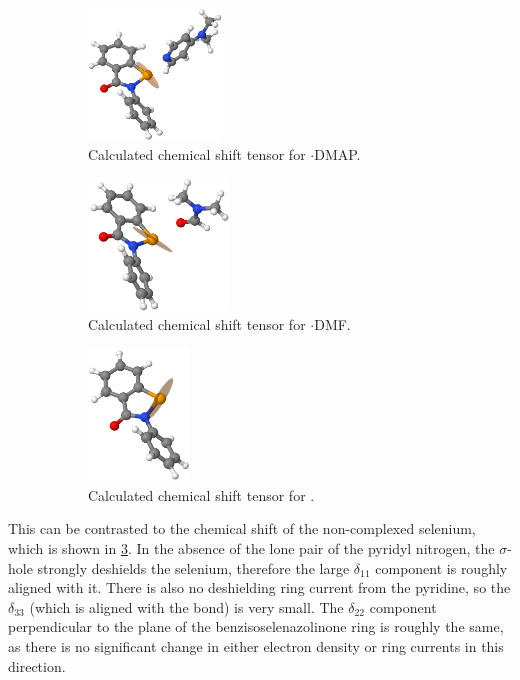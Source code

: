 \begin{refsection}
\begin{figure}
  \centering
  \begin{subfigure}{0.3\linewidth}
    \centering
    \includegraphics[height=3.5cm]{Figures/77se-tensor-ebs-dmap.png}
    \caption{Calculated chemical shift tensor for $ \cdot $DMAP.}\label{fig:77se-tensor-ebs-dmap}
  \end{subfigure}
  \begin{subfigure}{0.3\linewidth}
    \centering
    \includegraphics[height=3.5cm]{Figures/77se-tensor-ebs-dmf.png}
    \caption{Calculated chemical shift tensor for $ \cdot $DMF.}\label{fig:77se-tensor-ebs-dmf}
  \end{subfigure}
  \begin{subfigure}{0.3\linewidth}
    \centering
    \includegraphics[height=3.5cm]{Figures/77se-tensor-ebs.png}
    \caption{Calculated chemical shift tensor for .}\label{fig:77se-tensor-ebs}
  \end{subfigure}
  \caption[Calculated chemical shift tensors for ebselen derivatives.]{}\label{fig:77se-tensor}
\end{figure}

This can be contrasted to the chemical shift of the non-complexed selen\-ium, which is shown in \cref{fig:77se-tensor-ebs}.
In the absence of the lone pair of the pyridyl nitrogen, the $ \sigma $-hole strongly deshields the selenium, therefore the large $\delta_{11}$ component is roughly aligned with it.
There is also no deshielding ring current from the pyridine, so the $\delta_{33}$ (which is aligned with the  bond) is very small.
The $\delta_{22}$ component perpendicular to the plane of the benzisoselenazolinone ring is roughly the same, as there is no significant change in either electron density or ring currents in this direction.


\end{refsection}
